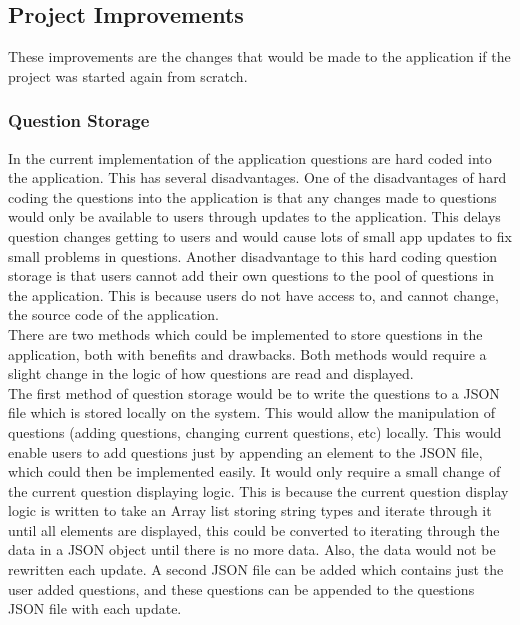 \documentclass{article}
\begin{document}
\subsection{Project Improvements}

These improvements are the changes that would be made to the application if the project was started again from scratch. 

\subsubsection{Question Storage}

In the current implementation of the application questions are hard coded into the application. This has several disadvantages. One of the disadvantages of hard coding the questions into the application is that any changes made to questions would only be available to users through updates to the application. This delays question changes getting to users and would cause lots of small app updates to fix small problems in questions. Another disadvantage to this hard coding question storage is that users cannot add their own questions to the pool of questions in the application. This is because users do not have access to, and cannot change, the source code of the application. \\

There are two methods which could be implemented to store questions in the application, both with benefits and drawbacks. Both methods would require a slight change in the logic of how questions are read and displayed. \\

The first method of question storage would be to write the questions to a JSON file which is stored locally on the system. This would allow the manipulation of questions (adding questions, changing current questions, etc) locally. This would enable users to add questions just by appending an element to the JSON file, which could then be implemented easily. It would only require a small change of the current question displaying logic. This is because the current question display logic is written to take an Array list storing string types and iterate through it until all elements are displayed, this could be converted to iterating through the data in a JSON object until there is no more data. Also, the data would not be rewritten each update. A second JSON file can be added which contains just the user added questions, and these questions can be appended to the questions JSON file with each update. \\
\end{document}
